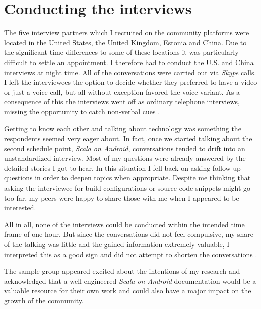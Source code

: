 \section{Conducting the interviews}

The five interview partners which I recruited on the community platforms were located in the United States, the United Kingdom, Estonia and China. Due to the significant time differences to some of these locations it was particularly difficult to settle an appointment. I therefore had to conduct the U.S. and China interviews at night time. All of the conversations were carried out via \textit{Skype} calls. I left the interviewees the option to decide whether they preferred to have a video or just a voice call, but all without exception favored the voice variant. As a consequence of this the interviews went off as ordinary telephone interviews, missing the opportunity to catch non-verbal cues \cite[p. 82]{berg01}.

Getting to know each other and talking about technology was something the respondents seemed very eager about. In fact, once we started talking about the second schedule point, \textit{Scala on Android}, conversations tended to drift into an unstandardized interview. Most of my questions were already answered by the detailed stories I got to hear. In this situation I fell back on asking follow-up questions in order to deepen topics when appropriate. Despite me thinking that asking the interviewee for build configurations or source code snippets might go too far, my peers were happy to share those with me when I appeared to be interested.

All in all, none of the interviews could be conducted within the intended time frame of one hour. But since the conversations did not feel compulsive, my share of the talking was little and the gained information extremely valuable, I interpreted this as a good sign and did not attempt to shorten the conversations \cite[p. 81]{berg01}.

The sample group appeared excited about the intentions of my research and acknowledged that a well-engineered \textit{Scala on Android} documentation would be a valuable resource for their own work and could also have a major impact on the growth of the community.